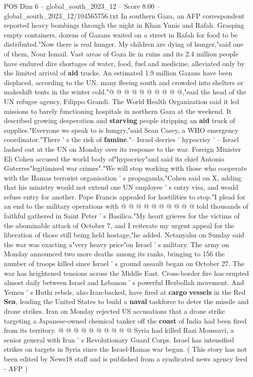\begin{textsample}{POS Dim 6 – global\_south\_2023\_12 – Score 8.00 – global\_south\_2023\_12/104565756.txt}
In southern Gaza, an AFP correspondent reported heavy bombings through the night in Khan Yunis and Rafah.
Grasping empty containers, dozens of Gazans waited on a street in Rafah for food to be distributed."Now there is real hunger.
My children are dying of hunger,"said one of them, Nour Ismail.
Vast areas of Gaza lie in ruins and its 2.4 million people have endured dire shortages of water, food, fuel and medicine, alleviated only by the limited arrival of \textbf{aid} trucks.
An estimated 1.9 million Gazans have been displaced, according to the UN, many fleeing south and crowded into shelters or makeshift tents in the winter cold."@ @ @ @ @ @ @ @ @ @,"said the head of the UN refugee agency, Filippo Grandi.
The World Health Organization said it led missions to barely functioning hospitals in northern Gaza at the weekend.
It described growing desperation and \textbf{starving} people stripping an \textbf{aid} truck of supplies."Everyone we speak to is hungry,"said Sean Casey, a WHO emergency coordinator."There ' s the risk of \textbf{famine}."-- Israel decries ' hypocrisy ' -- Israel lashed out at the UN on Monday over its response to the war.
Foreign Minister Eli Cohen accused the world body of"hypocrisy"and said its chief Antonio Guterres"legitimised war crimes"."We will stop working with those who cooperate with the Hamas terrorist organisation ' s propaganda,"Cohen said on X, adding that his ministry would not extend one UN employee ' s entry visa, and would refuse entry for another.
Pope Francis appealed for hostilities to stop."I plead for an end to the military operations with @ @ @ @ @ @ @ @ @ @ told thousands of faithful gathered in Saint Peter ' s Basilica."My heart grieves for the victims of the abominable attack of October 7, and I reiterate my urgent appeal for the liberation of those still being held hostage,"he added.
Netanyahu on Sunday said the war was exacting a"very heavy price"on Israel ' s military.
The army on Monday announced two more deaths among its ranks, bringing to 156 the number of troops killed since Israel ' s ground assault began on October 27.
The war has heightened tensions across the Middle East.
Cross-border fire has erupted almost daily between Israel and Lebanon ' s powerful Hezbollah movement.
And Yemen ' s Huthi rebels, also Iran-backed, have fired at \textbf{cargo} \textbf{vessels} in the Red \textbf{Sea}, leading the United States to build a \textbf{naval} taskforce to deter the missile and drone strikes.
Iran on Monday rejected US accusations that a drone strike targeting a Japanese-owned chemical tanker off the \textbf{coast} of India had been fired from its territory. @ @ @ @ @ @ @ @ @ @ Syria had killed Razi Moussavi, a senior general with Iran ' s Revolutionary Guard Corps.
Israel has intensified strikes on targets in Syria since the Israel-Hamas war began. ( This story has not been edited by News18 staff and is published from a syndicated news agency feed - AFP )

\end{textsample}

